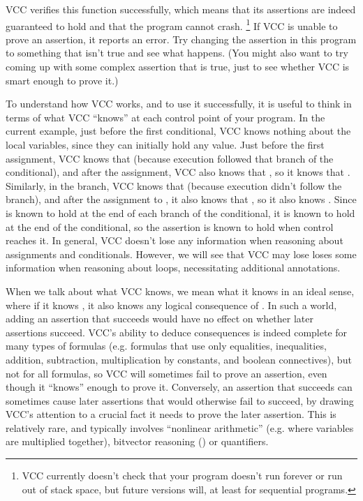 VCC verifies this function successfully, which means that its
assertions are indeed guaranteed to hold and that the program cannot
crash.%
\footnote{
  VCC currently doesn't check that your program doesn't run forever or
  run out of stack space, but future versions will, at least for sequential
  programs.  
}
If VCC is unable
to prove an assertion, it reports an error.  Try changing the
assertion in this program to something that isn't true and see what
happens. (You might also want to try coming up with some complex
assertion that is true, just to see whether VCC is smart enough to
prove it.)

To understand how VCC works, and to use it successfully, it is useful to
think in terms of what VCC ``knows'' at each control point
of your program. In the current example, just before the first conditional,
VCC  knows nothing about the local variables,
since they can initially hold any value. 
Just before the first assignment, VCC knows that 
 (because execution followed that branch of the conditional), and
after the assignment, VCC also knows that , 
so it knows that . Similarly, in the  branch,
VCC knows that  (because execution didn't follow the
 branch), and after the assignment to , it also knows
that , so it also knows . Since 
 is known to hold at the end of each branch of the
conditional, it is known to hold at the end of the conditional, so the
assertion is known to hold when control reaches it.
In general,
VCC doesn't lose any information when reasoning about assignments and
conditionals. However, we will see that VCC may lose
loses some information when reasoning about loops,
necessitating additional annotations.

When we talk about what VCC knows, we mean what it knows in an ideal
sense, where if it knows , it also knows any logical
consequence of . In such a world, adding an assertion that
succeeds would have no effect on whether later assertions succeed.
VCC's ability to deduce consequences is indeed complete for many types
of formulas (e.g. formulas that use only equalities,
inequalities, addition, subtraction, multiplication by constants, and
boolean connectives), but not for all formulas, so VCC will
sometimes fail to prove an assertion, even though it ``knows'' enough
to prove it.  Conversely, an assertion that succeeds can sometimes cause later assertions that
would otherwise fail to succeed, by drawing VCC's attention to a
crucial fact it needs to prove the later assertion.  This is
relatively rare, and typically involves ``nonlinear arithmetic''
(e.g. where variables are multiplied together), bitvector reasoning
() or quantifiers.

